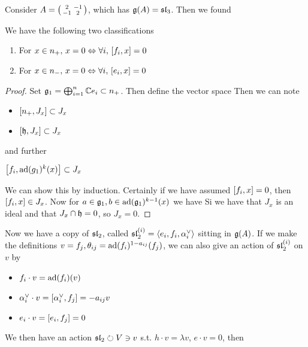 \documentclass{article}
\begin{document}
\begin{example}
Consider $A=\begin{psmallmatrix} 2 & -1 \\ -1 & 2 \end{psmallmatrix}$, which has $\mf{g}(A) = \mf{sl}_3$. Then we found 
\end{example}

\begin{lemma}
We have the following two classifications
\begin{enumerate}
    \item For $x \in n_+, \, x=0 \Leftrightarrow \forall i, \, \comm[f_i]{x} = 0$
    \item For $x \in n_-, \, x=0 \Leftrightarrow \forall i, \, \comm[e_i]{x} = 0$
\end{enumerate}
\end{lemma}
\begin{proof}
Set $\mf{g}_1 = \bigoplus_{i=1}^n \mbb{C} e_i \subset n_+$. Then define the vector space 
Then we can note 
\begin{itemize}
    \item $\comm[n_+]{J_x} \subset J_x$
    \item $\comm[\mf{h}]{J_x} \subset J_x$
\end{itemize}
and further 
\begin{claim}
$\comm[f_i]{\ad(g_1)^k(x)} \subset J_x$
\end{claim}
We can show this by induction. Certainly if we have assumed $\comm[f_i]{x} = 0$, then $\comm[f_i]{x} \in J_x$. Now for $a \in \mf{g}_1, b \in \ad(\mf{g}_1)^{k-1}(x)$ we have 
Si we have that $J_x$ is an ideal and that $J_x \cap \mf{h} = 0$, so $J_x= 0$. 
\end{proof}

Now we have a copy of $\mf{sl}_2$, called $\mf{sl}_2^{(i)} = \pangle{e_i,f_i,\alpha_i^\vee}$ sitting in $\mf{g}(A)$. If we make the definitions $v = f_j, \theta_{ij} = \ad(f_i)^{1-a_{ij}}(f_j)$, we can also give an action of $\mf{sl}_2^{(i)}$ on $v$ by 
\begin{itemize}
    \item $f_i \cdot v = \ad(f_i)(v)$
    \item $\alpha_i^\vee \cdot v = \comm[\alpha_i^\vee]{f_j} = -a_{ij}v$
    \item $e_i \cdot v = \comm[e_i]{f_j} = 0$
\end{itemize}
We then have an action $\mf{sl}_2 \lact V \ni v$ s.t. $h\cdot v = \lambda v$, $e \cdot v = 0$, then 
\end{document}
